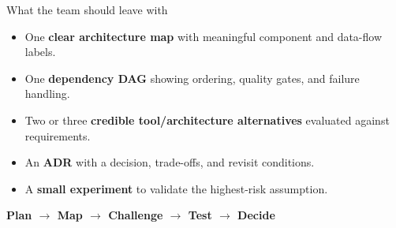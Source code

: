 \documentclass[aspectratio=43,10pt]{beamer}
\begin{document}
\begin{frame}{What the team should leave with}
\begin{itemize}
\item One \textbf{clear architecture map} with meaningful component and data-flow labels.
\item One \textbf{dependency DAG} showing ordering, quality gates, and failure handling.
\item Two or three \textbf{credible tool/architecture alternatives} evaluated against requirements.
\item An \textbf{ADR} with a decision, trade-offs, and revisit conditions.
\item A \textbf{small experiment} to validate the highest-risk assumption.
\end{itemize}
\vspace{.6em}
\centering\Large\textbf{Plan $\rightarrow$ Map $\rightarrow$ Challenge $\rightarrow$ Test $\rightarrow$ Decide}
\end{frame}
\end{document}
